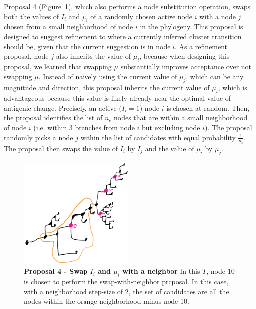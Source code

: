 \documentclass[11pt,oneside,letterpaper]{article}
\begin{document}
Proposal 4 (Figure~\ref{multistep}), which also performs a node substitution operation, swaps both the values of $I_i$ and $\mu_i$ of a randomly chosen active node $i$ with a node $j$ chosen from a small neighborhood of node $i$ in the phylogeny. 
This proposal is designed to suggest refinement to where a currently inferred cluster transition should be, given that the current suggestion is in node $i$.
As a refinement proposal, node $j$ also inherits the value of $\mu_i$, because when designing this proposal, we learned that swapping $\mu$ substantially improves acceptance over not swapping $\mu$.
Instead of naively using the current value of $\mu_j$, which can be any magnitude and direction, this proposal inherits the current value of  $\mu_i$, which is advantageous because this value is likely already near the optimal value of antigenic change.
Precisely, an active ($I_i=1$) node $i$ is chosen at random.
Then, the proposal identifies the list of $n_{c}$ nodes that are within a small neighborhood of node $i$ (i.e.  within 3 branches from node $i$ but excluding node $i$).
The proposal randomly picks a node $j$ within the list of candidates with equal probability $\frac{1}{n_{c}}$.
The proposal then swaps the value of $I_i$ by $I_j$ and the value of $\mu_i$ by $\mu_j$.




\begin{figure}[h]
	\centering		
	\includegraphics[width=0.5\textwidth]{figures/multistep}
	\caption{\textbf{Proposal 4 - Swap $I_i$ and $\mu_i$ with a neighbor} 
In this $T$, node 10 is chosen to perform the swap-with-neighbor proposal. In this case, with a neighborhood step-size of 2, the set of candidates are all the nodes within the orange neighborhood minus node 10.
	} 
	\label{multistep} 
\end{figure}
\end{document}
